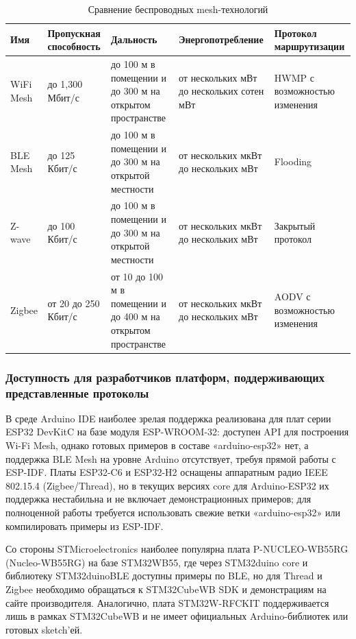 \documentclass[a4paper,12pt]{article}
\begin{document}
\begin{table}[h!]
    \centering
    \renewcommand{\arraystretch}{1.3}
    \begin{tabularx}{\textwidth}{|l|X|X|X|X|}
        \hline
        \textbf{Имя} & \textbf{Пропускная способность} & \textbf{Дальность} & \textbf{Энергопотребление} & \textbf{Протокол маршрутизации} \\
        \hline
        WiFi Mesh & до 1,300 Мбит/с & до 100 м в помещении и до 300 м на открытом пространстве & от нескольких мВт до нескольких сотен мВт & HWMP с возможностью изменения \\
        \hline
        BLE Mesh & до 125 Кбит/с & до 100 м в помещении и до 300 м на открытой местности & от нескольких мкВт до нескольких мВт & Flooding \\
        \hline
        Z-wave & до 100 Кбит/с & до 100 м в помещении и до 300 м на открытой местности & от нескольких мкВт до нескольких мВт & Закрытый протокол \\
        \hline
        Zigbee & от 20 до 250 Кбит/с & от 10 до 100 м в помещении и до 400 м на открытом пространстве & от нескольких мкВт до нескольких мВт & AODV с возможностью изменения \\
        \hline
    \end{tabularx}
    \caption{Сравнение беспроводных mesh-технологий}
    \label{table:compare_wireless_protocols}
\end{table}

\subsubsection{Доступность для разработчиков платформ, поддерживающих представленные протоколы}

В среде Arduino IDE наиболее зрелая поддержка реализована для плат серии ESP32 DevKitC на базе модуля ESP-WROOM-32: доступен API для построения Wi-Fi Mesh,
однако готовых примеров в составе «arduino-esp32» нет, а поддержка BLE Mesh на уровне Arduino отсутствует, требуя прямой работы с ESP-IDF. Платы ESP32-C6 и
ESP32-H2 оснащены аппаратным радио IEEE 802.15.4 (Zigbee/Thread), но в текущих версиях core для Arduino-ESP32 их поддержка нестабильна и не включает
демонстрационных примеров; для полноценной работы требуется использовать свежие ветки «arduino-esp32» или компилировать примеры из ESP-IDF.

Со стороны STMicroelectronics наиболее популярна плата P-NUCLEO-WB55RG (Nucleo-WB55RG) на базе STM32WB55, где через STM32duino core и библиотеку STM32duinoBLE
доступны примеры по BLE, но для Thread и Zigbee необходимо обращаться к STM32CubeWB SDK и демонстрациям на сайте производителя. Аналогично, плата STM32W-RFCKIT
поддерживается лишь в рамках STM32CubeWB и не имеет официальных Arduino-библиотек или готовых sketch’ей.
\end{document}
